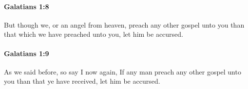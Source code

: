 		\paragraph{Galatians 1:8} %
			\label{GALATIANS-1-8}

			But though we, or an angel from heaven, preach any other gospel unto you than that which we have preached unto you, let him be accursed.

			\begin{framed}
			\scriptsize
				\begin{compactdesc}
					\item[SBLG] 
				\end{compactdesc}
			\end{framed}

		\paragraph{Galatians 1:9} %
			\label{GALATIANS-1-9}

			As we said before, so say I now again, If any man preach any other gospel unto you than that ye have received, let him be accursed.


